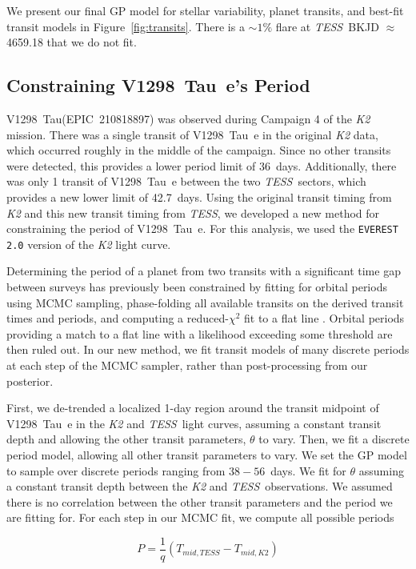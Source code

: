 \documentclass[twocolumn]{aastex631}
\newcommand{\tess}{\textit{TESS}}
\newcommand{\sname}{V1298~Tau\xspace}
\newcommand{\planete}{V1298~Tau~e\xspace}
\begin{document}
We present our final GP model for stellar variability, planet transits, and best-fit transit models in Figure~\ref{fig:transits}. There is a $\sim 1\%$ flare at \tess\ BKJD $\approx$ 4659.18 that we do not fit. 


\subsection{Constraining \planete's Period}

\sname (EPIC~210818897) was observed during Campaign 4 of the \textit{K2} mission. There was a single transit of \planete in the original \textit{K2} data, which occurred roughly in the middle of the campaign. Since no other transits were detected, this provides a lower period limit of 36~days. Additionally, there was only 1 transit of \planete between the two \tess\ sectors, which provides a new lower limit of 42.7~days. Using the original transit timing from \textit{K2} and this new transit timing from \tess, we developed a new method for constraining the period of \planete. For this analysis, we used the \texttt{EVEREST 2.0} \citep{luger18} version of the \textit{K2} light curve. 

Determining the period of a planet from two transits with a significant time gap between surveys has previously been constrained by fitting for orbital periods using MCMC sampling, phase-folding all available transits on the derived transit times and periods, and computing a reduced-$\chi^2$ fit to a flat line \citep{becker19}. Orbital periods providing a match to a flat line with a likelihood exceeding some threshold are then ruled out. In our new method, we fit transit models of many discrete periods at each step of the MCMC sampler, rather than post-processing from our posterior.

First, we de-trended a localized 1-day region around the transit midpoint of \planete in the \textit{K2} and \tess\ light curves, assuming a constant transit depth and allowing the other transit parameters, $\theta$ to vary. Then, we fit a discrete period model, allowing all other transit parameters to vary. We set the GP model to sample over discrete periods ranging from $38 - 56$~days. We fit for $\theta$ assuming a constant transit depth between the \textit{K2} and \tess\ observations. We assumed there is no correlation between the other transit parameters and the period we are fitting for. For each step in our MCMC fit, we compute all possible periods

\begin{equation}\label{eq:period}
    P = \frac{1}{q} \left(T_{mid,TESS} - T_{mid, K2}\right)
\end{equation}
\end{document}
